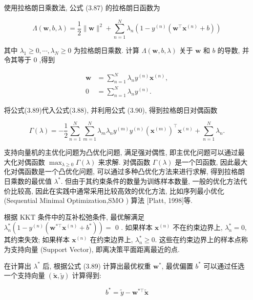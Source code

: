 \documentclass[10pt]{article}
\begin{document}
使用拉格朗日乘数法, 公式 (3.87) 的拉格朗日函数为


\begin{equation*}
\Lambda(\boldsymbol{w}, b, \lambda)=\frac{1}{2}\|\boldsymbol{w}\|^{2}+\sum_{n=1}^{N} \lambda_{n}\left(1-y^{(n)}\left(\boldsymbol{w}^{\top} \boldsymbol{x}^{(n)}+b\right)\right) \tag{3.88}
\end{equation*}


其中 $\lambda_{1} \geq 0, \cdots, \lambda_{N} \geq 0$ 为拉格朗日乘数. 计算 $\Lambda(\boldsymbol{w}, b, \lambda)$ 关于 $\boldsymbol{w}$ 和 $b$ 的导数, 并令其等于 0 ,得到


\begin{align*}
\boldsymbol{w} & =\sum_{n=1}^{N} \lambda_{n} y^{(n)} \boldsymbol{x}^{(n)},  \tag{3.89}\\
0 & =\sum_{n=1}^{N} \lambda_{n} y^{(n)} . \tag{3.90}
\end{align*}


将公式(3.89)代入公式(3.88), 并利用公式 (3.90), 得到拉格朗日对偶函数


\begin{equation*}
\Gamma(\lambda)=-\frac{1}{2} \sum_{n=1}^{N} \sum_{m=1}^{N} \lambda_{m} \lambda_{n} y^{(m)} y^{(n)}\left(\boldsymbol{x}^{(m)}\right)^{\top} \boldsymbol{x}^{(n)}+\sum_{n=1}^{N} \lambda_{n} . \tag{3.91}
\end{equation*}


支持向量机的主优化问题为凸优化问题, 满足强对偶性, 即主优化问题可以通过最大化对偶函数 $\max _{\lambda \geq 0} \Gamma(\lambda)$ 来求解. 对偶函数 $\Gamma(\lambda)$ 是一个凹函数, 因此最大化对偶函数是一个凸优化问题, 可以通过多种凸优化方法来进行求解, 得到拉格朗日乘数的最优值 $\lambda^{*}$. 但由于其约束条件的数量为训练样本数量, 一般的优化方法代价比较高, 因此在实践中通常采用比较高效的优化方法, 比如序列最小优化 (Sequential Minimal Optimization,SMO ) 算法 [Platt, 1998]等.

根据 $\mathrm{KKT}$ 条件中的互补松弛条件, 最优解满足 $\lambda_{n}^{*}\left(1-y^{(n)}\left(\boldsymbol{w}^{* \top} \boldsymbol{x}^{(n)}+b^{*}\right)\right)=$ 0 . 如果样本 $\boldsymbol{x}^{(n)}$ 不在约束边界上, $\lambda_{n}^{*}=0$, 其约束失效; 如果样本 $\boldsymbol{x}^{(n)}$ 在约束边界上, $\lambda_{n}^{*} \geq 0$. 这些在约束边界上的样本点称为支持向量 (Support Vector), 即离决策平面距离最近的点.

在计算出 $\lambda^{*}$ 后, 根据公式 (3.89) 计算出最优权重 $\boldsymbol{w}^{*}$, 最优偏置 $b^{*}$ 可以通过任选一个支持向量 $(\tilde{\boldsymbol{x}}, \tilde{y})$ 计算得到:


\begin{equation*}
b^{*}=\tilde{y}-\boldsymbol{w}^{* \top} \tilde{\boldsymbol{x}} \tag{3.92}
\end{equation*}
\end{document}
